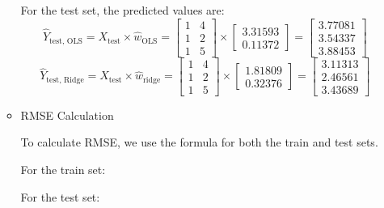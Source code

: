 \documentclass[12pt]{article}
\begin{document}
\begin{enumerate}[leftmargin=\labelsep, label=\textbf{\arabic*.)}]
\begin{itemize}
                    For the test set, the predicted values are:
                    \[
                        \hat{Y}_{\text{test, OLS}} = X_{\text{test}} \times \hat{w}_{\text{OLS}} = \begin{bmatrix} 1 & 4 \\ 1 & 2 \\ 1 & 5 \end{bmatrix} \times \begin{bmatrix} 3.31593 \\ 0.11372 \end{bmatrix} = \begin{bmatrix} 3.77081 \\ 3.54337 \\ 3.88453 \end{bmatrix}
                    \]
                    \[
                        \hat{Y}_{\text{test, Ridge}} = X_{\text{test}} \times \hat{w}_{\text{ridge}} = \begin{bmatrix} 1 & 4 \\ 1 & 2 \\ 1 & 5 \end{bmatrix} \times \begin{bmatrix} 1.81809 \\ 0.32376 \end{bmatrix} = \begin{bmatrix} 3.11313 \\ 2.46561 \\ 3.43689 \end{bmatrix}
                    \]

              \item RMSE Calculation

                    To calculate RMSE, we use the formula for both the train and test sets.

                    For the train set:



                    For the test set:


\end{itemize}
\end{enumerate}
\end{document}

